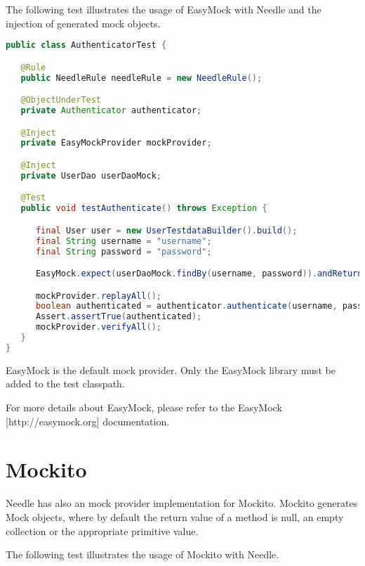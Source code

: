 The following test illustrates the usage of EasyMock with Needle and the injection of generated mock objects.

\begin{lstlisting}[language={JAVA},caption=Testing with EasyMock]
public class AuthenticatorTest {

   @Rule
   public NeedleRule needleRule = new NeedleRule();

   @ObjectUnderTest
   private Authenticator authenticator;

   @Inject
   private EasyMockProvider mockProvider;

   @Inject
   private UserDao userDaoMock;

   @Test
   public void testAuthenticate() throws Exception {

      final User user = new UserTestdataBuilder().build();
      final String username = "username";
      final String password = "password";

      EasyMock.expect(userDaoMock.findBy(username, password)).andReturn(user);

      mockProvider.replayAll();
      boolean authenticated = authenticator.authenticate(username, password);
      Assert.assertTrue(authenticated);
      mockProvider.verifyAll();
   }
}
\end{lstlisting}

EasyMock is the default mock provider. Only the EasyMock library must be added to the test classpath.

For more details about EasyMock, please refer to the EasyMock [http://easymock.org] documentation.

\section{Mockito}

Needle has also an mock provider implementation for Mockito.
Mockito generates Mock objects, where by default the return value of a method is null, an empty collection or the appropriate primitive value.

The following test illustrates the usage of Mockito with Needle.

